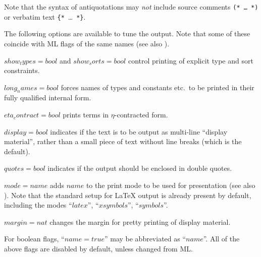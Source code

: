 Note that the syntax of antiquotations may \emph{not} include source comments
\texttt{(*~\dots~*)} or verbatim text \verb|{*|~\dots~\verb|*}|.

\medskip

The following options are available to tune the output.  Note that some of
these coincide with ML flags of the same names (see also \cite{isabelle-ref}).
\begin{descr}
\item[$show_types = bool$ and $show_sorts = bool$] control printing of
  explicit type and sort constraints.
\item[$long_names = bool$] forces names of types and constants etc.\ to be
  printed in their fully qualified internal form.
\item[$eta_contract = bool$] prints terms in $\eta$-contracted form.
\item[$display = bool$] indicates if the text is to be output as multi-line
  ``display material'', rather than a small piece of text without line breaks
  (which is the default).
\item[$quotes = bool$] indicates if the output should be enclosed in double
  quotes.
\item[$mode = name$] adds $name$ to the print mode to be used for presentation
  (see also \cite{isabelle-ref}).  Note that the standard setup for {\LaTeX}
  output is already present by default, including the modes ``$latex$'',
  ``$xsymbols$'', ``$symbols$''.
\item[$margin = nat$] changes the margin for pretty printing of display
  material.
\end{descr}

For boolean flags, ``$name = true$'' may be abbreviated as ``$name$''.  All of
the above flags are disabled by default, unless changed from ML.


